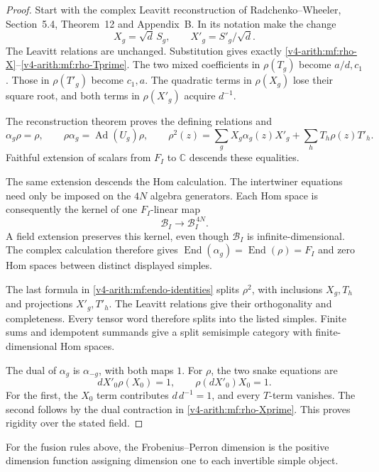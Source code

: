 \begin{proof}
Start with the complex Leavitt reconstruction of
Radchenko--Wheeler, Section~5.4, Theorem~12 and Appendix~B.
In its notation make the change
\[
 X_g=\sqrt d\,S_g,\qquad X'_g=S'_g/\sqrt d.
\]
The Leavitt relations are unchanged.
Substitution gives exactly
\eqref{v4-arith:mf:rho-X}--\eqref{v4-arith:mf:rho-Tprime}.
The two mixed coefficients in \(\rho(T_g)\) become \(a/d,c_1\).
Those in \(\rho(T'_g)\) become \(c_1,a\).
The quadratic terms in \(\rho(X_g)\) lose their square root,
and both terms in \(\rho(X'_g)\) acquire \(d^{-1}\).

The reconstruction theorem proves the defining relations and
\begin{equation}\label{v4-arith:mf:endo-identities}
 \alpha_g\rho=\rho,\qquad
 \rho\alpha_g=\operatorname{Ad}(U_g)\rho,\qquad
 \rho^2(z)=\sum_gX_g\alpha_g(z)X'_g+
                     \sum_hT_h\rho(z)T'_h.
\end{equation}
Faithful extension of scalars from \(F_I\) to \(\mathbb C\)
descends these equalities.

The same extension descends the Hom calculation.
The intertwiner equations need only be imposed on the \(4N\)
algebra generators. Each Hom space is consequently the kernel
of one \(F_I\)-linear map
\[
 \mathcal B_I\longrightarrow\mathcal B_I^{\,4N}.
\]
A field extension preserves this kernel, even though
\(\mathcal B_I\) is infinite-dimensional.
The complex calculation therefore gives
\(\operatorname{End}(\alpha_g)=\operatorname{End}(\rho)=F_I\)
and zero Hom spaces between distinct displayed simples.

The last formula in \eqref{v4-arith:mf:endo-identities}
splits \(\rho^2\), with inclusions \(X_g,T_h\)
and projections \(X'_g,T'_h\).
The Leavitt relations give their orthogonality and completeness.
Every tensor word therefore splits into the listed simples.
Finite sums and idempotent summands give a split semisimple
category with finite-dimensional Hom spaces.

The dual of \(\alpha_g\) is \(\alpha_{-g}\), with both maps \(1\).
For \(\rho\), the two snake equations are
\[
 dX'_0\rho(X_0)=1,\qquad \rho(dX'_0)X_0=1.
\]
For the first, the \(X_0\) term contributes
\(d\,d^{-1}=1\), and every \(T\)-term vanishes.
The second follows by the dual contraction in
\eqref{v4-arith:mf:rho-Xprime}.
This proves rigidity over the stated field.
\end{proof}

For the fusion rules above, the Frobenius--Perron dimension is
the positive dimension function assigning dimension one to each
invertible simple object.

